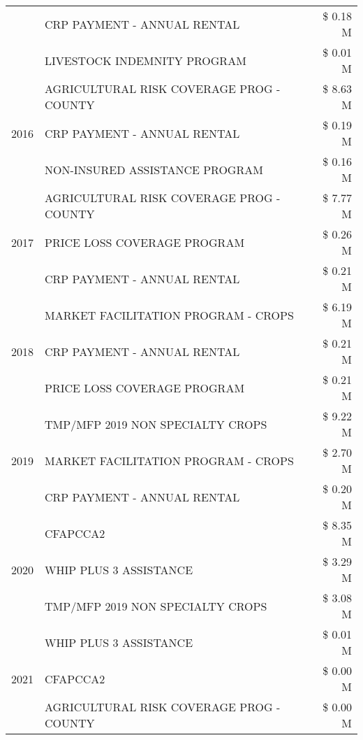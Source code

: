 \begin{tabular}{llr}
 & CRP PAYMENT - ANNUAL RENTAL & \$ 0.18 M \\
 & LIVESTOCK INDEMNITY PROGRAM & \$ 0.01 M \\
\cline{1-3}
\multirow[t]{3}{*}{2016} & AGRICULTURAL RISK COVERAGE PROG - COUNTY      & \$ 8.63 M \\
 & CRP PAYMENT - ANNUAL RENTAL                   & \$ 0.19 M \\
 & NON-INSURED ASSISTANCE PROGRAM                & \$ 0.16 M \\
\cline{1-3}
\multirow[t]{3}{*}{2017} & AGRICULTURAL RISK COVERAGE PROG - COUNTY & \$ 7.77 M \\
 & PRICE LOSS COVERAGE PROGRAM & \$ 0.26 M \\
 & CRP PAYMENT - ANNUAL RENTAL & \$ 0.21 M \\
\cline{1-3}
\multirow[t]{3}{*}{2018} & MARKET FACILITATION PROGRAM - CROPS & \$ 6.19 M \\
 & CRP PAYMENT - ANNUAL RENTAL & \$ 0.21 M \\
 & PRICE LOSS COVERAGE PROGRAM & \$ 0.21 M \\
\cline{1-3}
\multirow[t]{3}{*}{2019} & TMP/MFP 2019 NON SPECIALTY CROPS & \$ 9.22 M \\
 & MARKET FACILITATION PROGRAM - CROPS & \$ 2.70 M \\
 & CRP PAYMENT - ANNUAL RENTAL & \$ 0.20 M \\
\cline{1-3}
\multirow[t]{3}{*}{2020} & CFAPCCA2 & \$ 8.35 M \\
 & WHIP PLUS 3 ASSISTANCE & \$ 3.29 M \\
 & TMP/MFP 2019 NON SPECIALTY CROPS & \$ 3.08 M \\
\cline{1-3}
\multirow[t]{3}{*}{2021} & WHIP PLUS 3 ASSISTANCE & \$ 0.01 M \\
 & CFAPCCA2 & \$ 0.00 M \\
 & AGRICULTURAL RISK COVERAGE PROG - COUNTY & \$ 0.00 M \\
\cline{1-3}
\bottomrule
\end{tabular}
